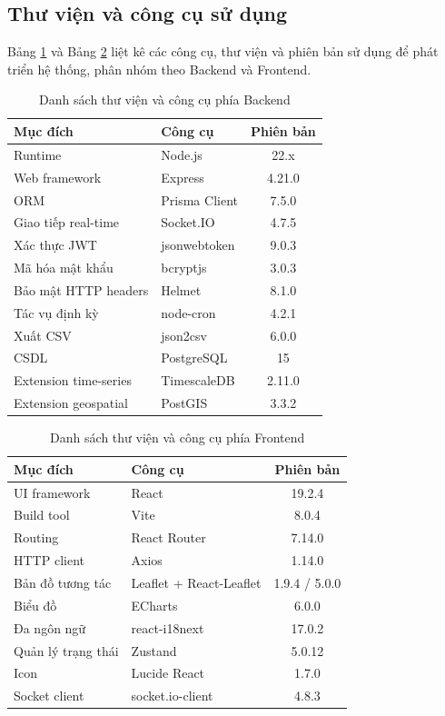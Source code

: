 \documentclass[../DoAn.tex]{subfiles}
\begin{document}
\subsection{Thư viện và công cụ sử dụng}
\label{subsection:4.3.1}

Bảng \ref{table:tools_backend} và Bảng \ref{table:tools_frontend} liệt kê các công cụ, thư viện và phiên bản sử dụng để phát triển hệ thống, phân nhóm theo Backend và Frontend.

\begin{table}[H]
\centering
\caption{Danh sách thư viện và công cụ phía Backend}
\label{table:tools_backend}
\small
\begin{tabularx}{\textwidth}{|X|X|c|}
\hline
\textbf{Mục đích} & \textbf{Công cụ} & \textbf{Phiên bản} \\
\hline
Runtime & Node.js & 22.x \\
\hline
Web framework & Express & 4.21.0 \\
\hline
ORM & Prisma Client & 7.5.0 \\
\hline
Giao tiếp real-time & Socket.IO & 4.7.5 \\
\hline
Xác thực JWT & jsonwebtoken & 9.0.3 \\
\hline
Mã hóa mật khẩu & bcryptjs & 3.0.3 \\
\hline
Bảo mật HTTP headers & Helmet & 8.1.0 \\
\hline
Tác vụ định kỳ & node-cron & 4.2.1 \\
\hline
Xuất CSV & json2csv & 6.0.0 \\
\hline
CSDL & PostgreSQL & 15 \\
\hline
Extension time-series & TimescaleDB & 2.11.0 \\
\hline
Extension geospatial & PostGIS & 3.3.2 \\
\hline
\end{tabularx}
\end{table}

\begin{table}[H]
\centering
\caption{Danh sách thư viện và công cụ phía Frontend}
\label{table:tools_frontend}
\small
\begin{tabularx}{\textwidth}{|X|X|c|}
\hline
\textbf{Mục đích} & \textbf{Công cụ} & \textbf{Phiên bản} \\
\hline
UI framework & React & 19.2.4 \\
\hline
Build tool & Vite & 8.0.4 \\
\hline
Routing & React Router & 7.14.0 \\
\hline
HTTP client & Axios & 1.14.0 \\
\hline
Bản đồ tương tác & Leaflet + React-Leaflet & 1.9.4 / 5.0.0 \\
\hline
Biểu đồ & ECharts & 6.0.0 \\
\hline
Đa ngôn ngữ & react-i18next & 17.0.2 \\
\hline
Quản lý trạng thái & Zustand & 5.0.12 \\
\hline
Icon & Lucide React & 1.7.0 \\
\hline
Socket client & socket.io-client & 4.8.3 \\
\hline
\end{tabularx}
\end{table}
\end{document}
